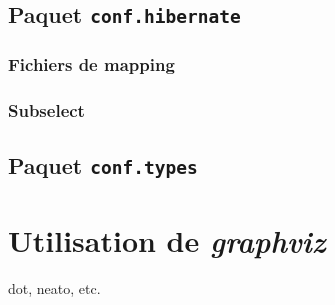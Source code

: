\subsection{Paquet \texttt{conf.hibernate}}
\subsubsection{Fichiers de mapping}
\subsubsection{Subselect}

\subsection{Paquet \texttt{conf.types}}
\label{subsection:conf.types}


\section{Utilisation de \emph{graphviz}}
dot, neato, etc.